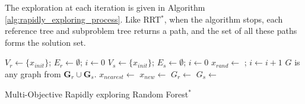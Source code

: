 \documentclass{article}
\begin{document}
The exploration at each iteration is given in Algorithm \ref{alg:rapidly_exploring_process}.  Like RRT$^{*}$, when the algorithm stops, each reference tree and subproblem tree returns a path, and the set of all these paths forms the solution set.

\begin{algorithm}
	\begin{algorithmic}[1]
		\State $ V_{r} \leftarrow \{ x_{init} \} $; $ E_{r} \leftarrow \emptyset $; $ i \leftarrow 0 $
		\EndFor
		\State $ V_{s} \leftarrow \{ x_{init} \} $; $ E_{s} \leftarrow \emptyset $; $ i \leftarrow 0 $
		\EndFor
		\State $ x_{rand} \leftarrow $  ; $ i \leftarrow i + 1 $
		\State $G$ is any graph from ${\mathbf G}_r\cup {\mathbf G}_s$.
		\State $ x_{nearest} \leftarrow $ 
		\State $ x_{new} \leftarrow $ 
		\State $ G_{r} \leftarrow $ 
		\EndFor
		\State $ G_{s} \leftarrow $ 
		\EndFor
		\EndIf
		\EndWhile
	\end{algorithmic}
	\caption{Multi-Objective Rapidly exploring Random Forest$^{*}$ }
	\label{alg:rapidly_exploring_process}
\end{algorithm}
\end{document}
